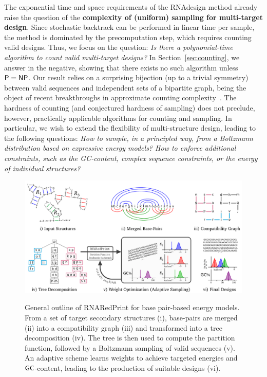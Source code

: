 \documentclass{bioinfo}
\newcommand{\Def}[1]{{\bf #1}}
\newcommand{\TODO}[1]{\Final{\begin{mdframed}[leftline=false,rightline=false,linecolor=red!70!black,linewidth=1.5pt]\color{red!70!black}\sf TODO: #1\end{mdframed}}}
\newcommand{\parHead}[1]{\Final{\paragraph{#1}}}
\newcommand{\Final}[1]{#1}
\renewcommand{\Final}[1]{}
\newcommand{\Nuc}[1]{{\sf #1}}
\newcommand{\Cb}{\Nuc{C}}
\newcommand{\Gb}{\Nuc{G}}
\newcommand{\Software}[1]{{\ttfamily #1}}
\newcommand{\ourprog}{\Software{RNARedPrint}}
\begin{document}
\TODO{Develop questions (relevance, difficulty...). Maybe tease results?}
\parHead{Motivation.} The exponential time and space requirements of the \Software{RNAdesign} method already raise the question of the \Def{complexity of (uniform) sampling for multi-target design}. Since stochastic backtrack can be performed in linear time per sample, the method is dominated by the precomputation step, which requires counting valid designs. Thus, we focus on the question: \emph{Is there a polynomial-time algorithm to count valid multi-target designs?} In Section~\ref{sec:counting}, we answer in the negative, showing that there exists no such algorithm unless ${\sf P}={\sf NP}$. Our result relies on a surprising bijection (up to a trivial symmetry) between valid sequences  and independent sets of a bipartite graph, being the object of recent breakthroughs in approximate counting complexity~\cite{Bulatov2013,Cai2016}.
The hardness of counting (and conjectured hardness of sampling) does not preclude, however, practically applicable algorithms for counting and sampling. In particular, we wish to extend the flexibility of multi-structure design, leading to the following questions: \emph{How to sample, in a principled way, from a Boltzmann distribution based on expressive energy models? How to enforce additional constraints, such as the \Gb\Cb-content, complex sequence constraints, or the energy of individual structures?} 


\begin{figure}[t]
{\centering\includegraphics[width=.8\textwidth]{Workflow}\\}
\caption{General outline of \ourprog{} for base pair-based energy models. From a set of target secondary structures (i), base-pairs are merged (ii) into a compatibility graph (iii) and transformed into a tree decomposition (iv). The tree is then used to compute the partition function, followed by a Boltzmann sampling of valid sequences (v). An adaptive scheme learns weights to achieve targeted energies and $\Gb\Cb$-content, leading to the production of suitable designs (vi).}
\label{fig:workflow}
\end{figure}
\end{document}
